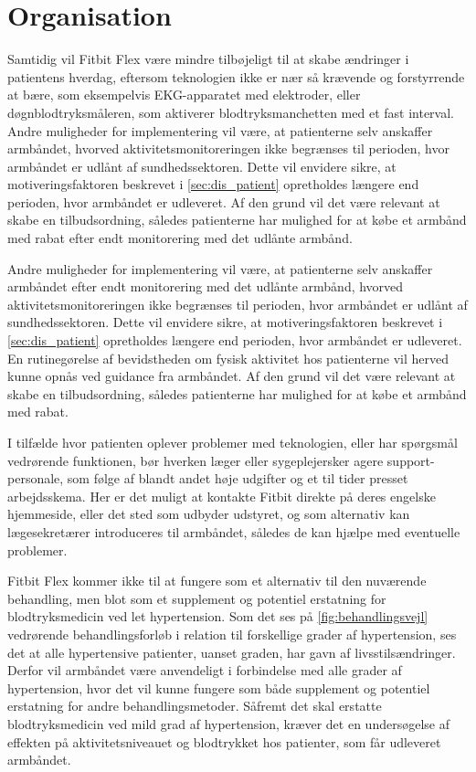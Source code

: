 \section{Organisation} \label{sec:dis_organisation}


Samtidig vil Fitbit Flex være mindre tilbøjeligt til at skabe ændringer i patientens hverdag, eftersom teknologien ikke er nær så krævende og forstyrrende at bære, som eksempelvis EKG-apparatet med elektroder, eller døgnblodtryksmåleren, som aktiverer blodtryksmanchetten med et fast interval. Andre muligheder for implementering vil være, at patienterne selv anskaffer armbåndet, hvorved aktivitetsmonitoreringen ikke begrænses til perioden, hvor armbåndet er udlånt af sundhedssektoren. Dette vil envidere sikre, at motiveringsfaktoren beskrevet i \autoref{sec:dis_patient} opretholdes længere end perioden, hvor armbåndet er udleveret. Af den grund vil det være relevant at skabe en tilbudsordning, således patienterne har mulighed for at købe et armbånd med rabat efter endt monitorering med det udlånte armbånd.

Andre muligheder for implementering vil være, at patienterne selv anskaffer armbåndet efter endt monitorering med det udlånte armbånd, hvorved aktivitetsmonitoreringen ikke begrænses til perioden, hvor armbåndet er udlånt af sundhedssektoren. Dette vil envidere sikre, at motiveringsfaktoren beskrevet i \autoref{sec:dis_patient} opretholdes længere end perioden, hvor armbåndet er udleveret. En rutinegørelse af bevidstheden om fysisk aktivitet hos patienterne vil herved kunne opnås ved guidance fra armbåndet. Af den grund vil det være relevant at skabe en tilbudsordning, således patienterne har mulighed for at købe et armbånd med rabat.

I tilfælde hvor patienten oplever problemer med teknologien, eller har spørgsmål vedrørende funktionen, bør hverken læger eller sygeplejersker agere support-personale, som følge af blandt andet høje udgifter og et til tider presset arbejdsskema. Her er det muligt at kontakte Fitbit direkte på deres engelske hjemmeside, eller det sted som udbyder udstyret, og som alternativ kan lægesekretærer introduceres til armbåndet, således de kan hjælpe med eventuelle problemer.

Fitbit Flex kommer ikke til at fungere som et alternativ til den nuværende behandling, men blot som et supplement og potentiel erstatning for blodtryksmedicin ved let hypertension. Som det ses på \autoref{fig:behandlingsvejl} vedrørende behandlingsforløb i relation til forskellige grader af hypertension, ses det at alle hypertensive patienter, uanset graden, har gavn af livsstilsændringer. Derfor vil armbåndet være anvendeligt i forbindelse med alle grader af hypertension, hvor det vil kunne fungere som både supplement og potentiel erstatning for andre behandlingsmetoder. Såfremt det skal erstatte blodtryksmedicin ved mild grad af hypertension, kræver det en undersøgelse af effekten på aktivitetsniveauet og blodtrykket hos patienter, som får udleveret armbåndet.

